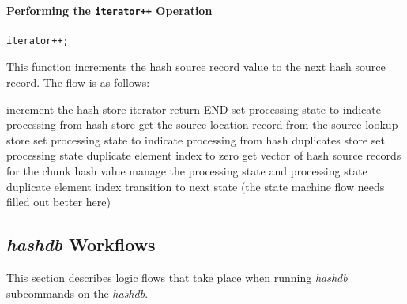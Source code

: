 \documentclass[12pt,twoside]{article}
\newcommand{\hdb}{\emph{hashdb}\xspace}
\begin{document}
\paragraph{Performing the \texttt{iterator++} Operation}
\begin{small}
\begin{verbatim}
iterator++;
\end{verbatim}
\end{small}
This function increments the hash source record value to the next hash source record.
The flow is as follows:

\begin{algorithmic}
  \STATE increment the hash store iterator
    \STATE return END
  \ELSE
      \STATE set processing state to indicate processing from hash store
      \STATE get the source location record from the source lookup store
    \ELSE
      \STATE set processing state to indicate processing from hash duplicates store
      \STATE set processing state duplicate element index to zero
      \STATE get vector of hash source records for the chunk hash value
    \ENDIF
  \ENDIF
\ELSE
  \STATE manage the processing state and processing state duplicate element index
  \STATE transition to next state (the state machine flow needs filled out better here)
\ENDIF
\end{algorithmic}

\subsection{\hdb Workflows}
This section describes logic flows that take place
when running \hdb subcommands on the \hdb.

\end{document}
